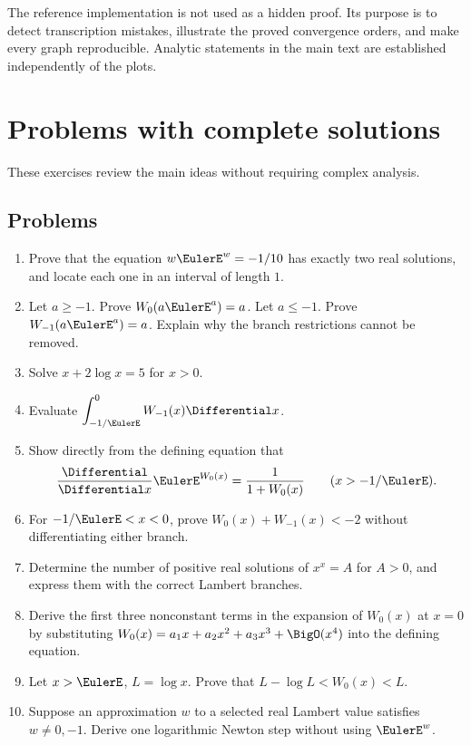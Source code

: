 \documentclass[11pt]{article}
\theoremstyle{remark}
\begin{document}


The reference implementation is not used as a hidden proof.  Its purpose is
to detect transcription mistakes, illustrate the proved convergence orders,
and make every graph reproducible.  Analytic statements in the main text are
established independently of the plots.

\section{Problems with complete solutions}\label{app:problems}

These exercises review the main ideas without requiring complex analysis.

\subsection*{Problems}
\begin{enumerate}[label=\textbf{P\arabic*.},leftmargin=*]
\item Prove that the equation \(w\EulerE^w=-1/10\) has exactly two real
solutions, and locate each one in an interval of length \(1\).

\item Let \(a\geq-1\).  Prove \(W_0(a\EulerE^a)=a\).  Let \(a\leq-1\).
Prove \(W_{-1}(a\EulerE^a)=a\).  Explain why the branch restrictions cannot be
removed.

\item Solve \(x+2\log x=5\) for \(x>0\).

\item Evaluate
\(\displaystyle\int_{-1/\EulerE}^{0}W_{-1}(x)\Differential x\).

\item Show directly from the defining equation that
\[
       \frac{\Differential}{\Differential x}\EulerE^{W_0(x)}
       =\frac1{1+W_0(x)}
       \qquad(x>-1/\EulerE).
\]

\item For \(-1/\EulerE<x<0\), prove
\(W_0(x)+W_{-1}(x)<-2\) without differentiating either branch.

\item Determine the number of positive real solutions of \(x^x=A\) for
\(A>0\), and express them with the correct Lambert branches.

\item Derive the first three nonconstant terms in the expansion of
\(W_0(x)\) at \(x=0\) by substituting
\(W_0(x)=a_1x+a_2x^2+a_3x^3+\BigO(x^4)\) into the defining equation.

\item Let \(x>\EulerE\), \(L=\log x\).  Prove that
\(L-\log L<W_0(x)<L\).

\item Suppose an approximation \(w\) to a selected real Lambert value
satisfies \(w\neq0,-1\).  Derive one logarithmic Newton step without using
\(\EulerE^w\).
\end{enumerate}
\end{document}

